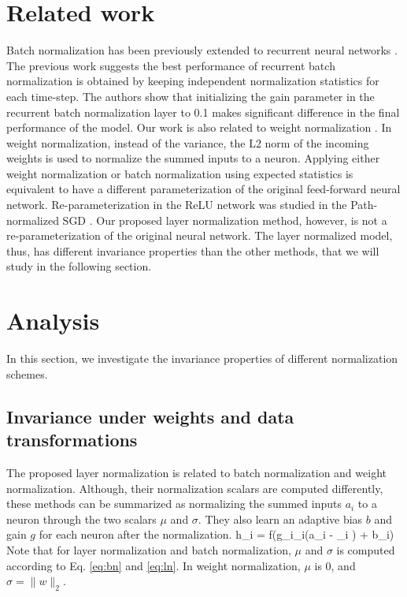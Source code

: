 \section{Related work} Batch normalization has been previously extended to recurrent neural networks \citep{laurent2015batch, amodei2015deep, cooijmans2016recurrent}. The previous work \citep{cooijmans2016recurrent} suggests the best performance of recurrent batch normalization is obtained by keeping independent normalization statistics for each time-step. The authors show that initializing the gain parameter in the recurrent batch normalization layer to 0.1 makes significant difference in the final performance of the model. Our work is also related to weight normalization \citep{salimans2016weight}.  In weight normalization, instead of the variance, the L2 norm of the incoming weights is used to normalize the summed inputs to a neuron. Applying either weight normalization or batch normalization using expected statistics is equivalent to have a different parameterization of the original feed-forward neural network. Re-parameterization in the ReLU network was studied in the Path-normalized SGD \citep{neyshabur2015path}. Our proposed layer normalization method, however, is not a re-parameterization of the original neural network. The layer normalized model, thus, has different invariance properties than the other methods, that we will study in the following section.

\section{Analysis}
\label{sec:analysis}
In this section, we investigate the invariance properties of different normalization schemes.  

\subsection{Invariance under weights and data transformations} The proposed layer normalization is related to batch normalization and weight normalization. Although, their normalization scalars are computed differently, these methods can be summarized as normalizing the summed inputs $a_i$ to a neuron through the two scalars $\mu$ and $\sigma$. They also learn an adaptive bias $b$ and gain $g$ for each neuron after the normalization.
\bea
h_i = f({{g}_i\over\sigma_i}\left(a_i - \mu_i \right) + b_i)
\eea
Note that for layer normalization and batch normalization, $\mu$ and $\sigma$ is computed according to Eq. \ref{eq:bn} and \ref{eq:ln}. In weight normalization, $\mu$ is 0, and $\sigma = \|{w}\|_2$. 

